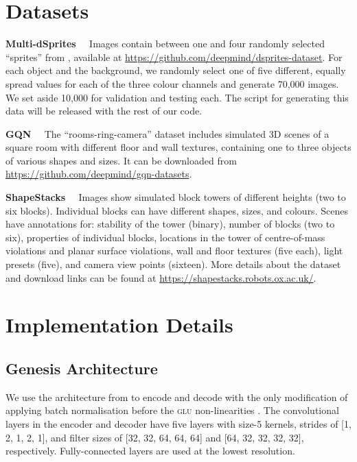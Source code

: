 \documentclass{article}
\begin{document}
  

\clearpage
\appendix


\section{Datasets}
\label{app:datasets}

\textbf{Multi-dSprites \citep{burgess2019monet}}\ \
Images contain between one and four randomly selected ``sprites'' from \citet{matthey2017dsprites}, available at \url{https://github.com/deepmind/dsprites-dataset}.
For each object and the background, we randomly select one of five different, equally spread values for each of the three colour channels and generate 70,000 images.
We set aside 10,000 for validation and testing each.
The script for generating this data will be released with the rest of our code.

\textbf{GQN \citep{eslami2018neural}}\ \
The ``rooms-ring-camera'' dataset includes simulated 3D scenes of a square room with different floor and wall textures, containing one to three objects of various shapes and sizes.
It can be downloaded from \url{https://github.com/deepmind/gqn-datasets}.

\textbf{ShapeStacks \citep{groth2018shapestacks}}\ \
Images show simulated block towers of different heights (two to six blocks).
Individual blocks can have different shapes, sizes, and colours.
Scenes have annotations for: stability of the tower (binary), number of blocks (two to six), properties of individual blocks, locations in the tower of centre-of-mass violations and planar surface violations, wall and floor textures (five each), light presets (five), and camera view points (sixteen).
More details about the dataset and download links can be found at \url{https://shapestacks.robots.ox.ac.uk/}.




\section{Implementation Details}
\label{app:implementation}


\subsection{Genesis Architecture}
\label{app:genesis_architecture}

We use the architecture from \citet{berg2018sylvester} to encode and decode  with the only modification of applying batch normalisation \citep{ioffe2015batch} before the \textsc{glu} non-linearities \citep{dauphin2017language}.
The convolutional layers in the encoder and decoder have five layers with size-5 kernels, strides of [1, 2, 1, 2, 1], and filter sizes of [32, 32, 64, 64, 64] and [64, 32, 32, 32, 32], respectively.
Fully-connected layers are used at the lowest resolution.
\end{document}
